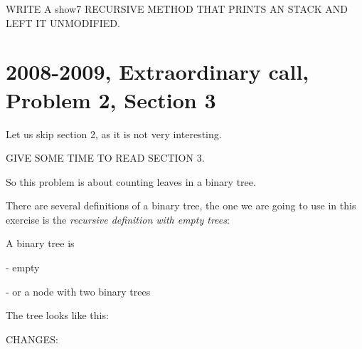 \documentclass[a4paper, 9pt]{extarticle}
\begin{document}
WRITE A show7 RECURSIVE METHOD THAT PRINTS AN STACK AND LEFT IT UNMODIFIED.

\begin{multicols}{2}
\columnbreak
{}
\end{multicols}









\newpage

\section{2008-2009, Extraordinary call, Problem 2, Section 3}

Let us skip section 2, as it is not very interesting.

GIVE SOME TIME TO READ SECTION 3.

So this problem is about counting leaves in a binary tree.

There are several definitions of a binary tree, the one we are going to use in this
exercise is the \emph{recursive definition with empty trees}:

\begin{blackboard}
A binary tree is

  - empty

  - or a node with two binary trees
\end{blackboard}

The tree looks like this:

\begin{multicols}{2}
\end{multicols}

CHANGES:
\end{document}
